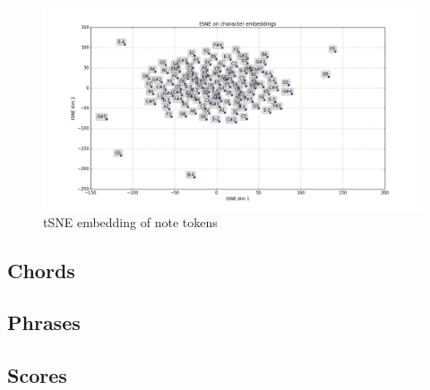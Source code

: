 \begin{figure}[htpb]
    \centering
    \includegraphics[width=0.8\linewidth]{Figures/tSNE-notes.png}
    \caption{tSNE embedding of note tokens}
    \label{fig:tsne-notes}
\end{figure}

\subsection{Chords}

\subsection{Phrases}

\subsection{Scores}

